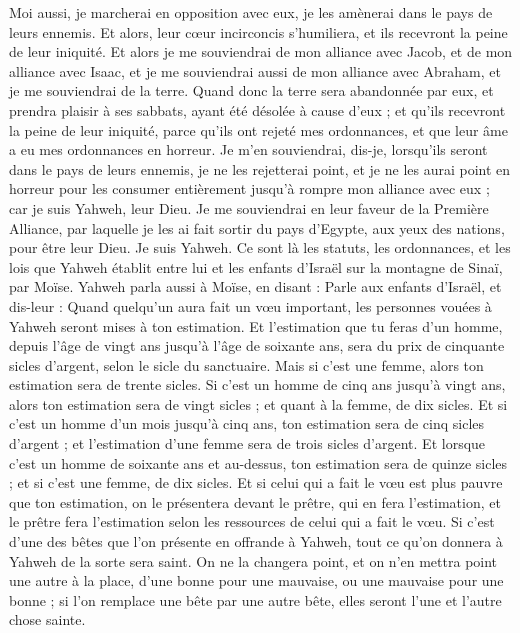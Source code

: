 \begin{multicols}{2}
Moi aussi, je marcherai en opposition avec eux, je les amènerai dans le pays de leurs ennemis. Et alors, leur cœur incirconcis s'humiliera, et ils recevront la peine de leur iniquité.
Et alors je me souviendrai de mon alliance avec Jacob, et de mon alliance avec Isaac, et je me souviendrai aussi de mon alliance avec Abraham, et je me souviendrai de la terre.
Quand donc la terre sera abandonnée par eux, et prendra plaisir à ses sabbats, ayant été désolée à cause d'eux ; et qu'ils recevront la peine de leur iniquité, parce qu'ils ont rejeté mes ordonnances, et que leur âme a eu mes ordonnances en horreur.
Je m'en souviendrai, dis-je, lorsqu'ils seront dans le pays de leurs ennemis, je ne les rejetterai point, et je ne les aurai point en horreur pour les consumer entièrement jusqu'à rompre mon alliance avec eux ; car je suis Yahweh, leur Dieu.
Je me souviendrai en leur faveur de la Première Alliance, par laquelle je les ai fait sortir du pays d'Egypte, aux yeux des nations, pour être leur Dieu. Je suis Yahweh.
Ce sont là les statuts, les ordonnances, et les lois que Yahweh établit entre lui et les enfants d'Israël sur la montagne de Sinaï, par Moïse.
\VerseOne{}Yahweh parla aussi à Moïse, en disant :
Parle aux enfants d'Israël, et dis-leur : Quand quelqu'un aura fait un vœu important, les personnes vouées à Yahweh seront mises à ton estimation.
Et l'estimation que tu feras d'un homme, depuis l'âge de vingt ans jusqu'à l'âge de soixante ans, sera du prix de cinquante sicles d'argent, selon le sicle du sanctuaire.
Mais si c'est une femme, alors ton estimation sera de trente sicles.
Si c'est un homme de cinq ans jusqu'à vingt ans, alors ton estimation sera de vingt sicles ; et quant à la femme, de dix sicles.
Et si c'est un homme d'un mois jusqu'à cinq ans, ton estimation sera de cinq sicles d'argent ; et l'estimation d'une femme sera de trois sicles d'argent.
Et lorsque c'est un homme de soixante ans et au-dessus, ton estimation sera de quinze sicles ; et si c'est une femme, de dix sicles.
Et si celui qui a fait le vœu est plus pauvre que ton estimation, on le présentera devant le prêtre, qui en fera l'estimation, et le prêtre fera l'estimation selon les ressources de celui qui a fait le vœu.
Si c'est d'une des bêtes que l'on présente en offrande à Yahweh, tout ce qu'on donnera à Yahweh de la sorte sera saint.
On ne la changera point, et on n'en mettra point une autre à la place, d'une bonne pour une mauvaise, ou une mauvaise pour une bonne ; si l'on remplace une bête par une autre bête, elles seront l'une et l'autre chose sainte.

\end{multicols}
